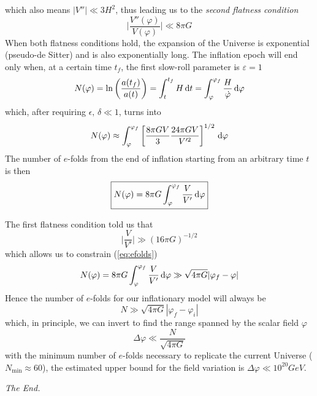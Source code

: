 which also means $|V''|\ll 3H^{2}$, thus leading us to the \emph{second flatness condition}
\begin{equation}
    \boxed{
    \Big|\frac{V''(\varphi)}{V(\varphi)}\Big| \ll 8\pi G
    }
    \label{eq:flatness2}
\end{equation}
When both flatness conditions hold, the expansion of the Universe is exponential (pseudo-de Sitter) and is also exponentially long. The inflation epoch will end only when, at a certain time $t_{f}$, the first slow-roll parameter is $\varepsilon = 1$
\begin{equation}
    N(\varphi) = \ln\left(\frac{a(t_{f})}{a(t)}\right) = \int_{t}^{t_{f}}H\,\text{d}t = \int_{\varphi}^{\varphi_{f}}\frac{H}{\dot{\varphi}}\,\text{d}\varphi
\end{equation}
which, after requiring $\epsilon,\,\delta \ll 1$, turns into 
\begin{equation}
     N(\varphi) \approx \int_{\varphi}^{\varphi_{f}}\left[\frac{8\pi G V}{3}\frac{24\pi G V}{V'^{2}}\right]^{1/2}\,\text{d}\varphi
\end{equation}
The number of $e$-folds from the end of inflation starting from an arbitrary time $t$ is then 
\begin{equation}
    \boxed{
    N(\varphi) = 8\pi G \int_{\varphi}^{\varphi_{f}}\frac{V}{V'}\,\text{d}\varphi
    }
    \label{eq:efolds}
\end{equation}
\par The first flatness condition told us that 
\begin{equation}
    \Big|\frac{V}{V'}\Big| \gg (16\pi G)^{-1/2}
\end{equation}
which allows us to constrain (\ref{eq:efolds})
\begin{equation}
    N(\varphi) = 8\pi G \int_{\varphi}^{\varphi_{f}}\frac{V}{V'}\,\text{d}\varphi \gg \sqrt{4\pi G}|\varphi_{f}-\varphi|
\end{equation}
Hence the number of $e$-folds for our inflationary model will always be
\begin{equation}
    N \gg \sqrt{4\pi G}|\varphi_{f}-\varphi_{i}|
\end{equation}
which, in principle, we can invert to find the range spanned by the scalar field $\varphi$
\begin{equation}
    \Delta\varphi \ll \frac{N}{\sqrt{4\pi G}}
\end{equation}
with the minimum number of $e$-folds necessary to replicate the current Universe ($N_{\text{min}} \approx 60$), the estimated upper bound for the field variation is $\Delta\varphi \ll 10^{20}\unit{GeV}$.
\begin{flushright}
    \emph{The End.}
\end{flushright}